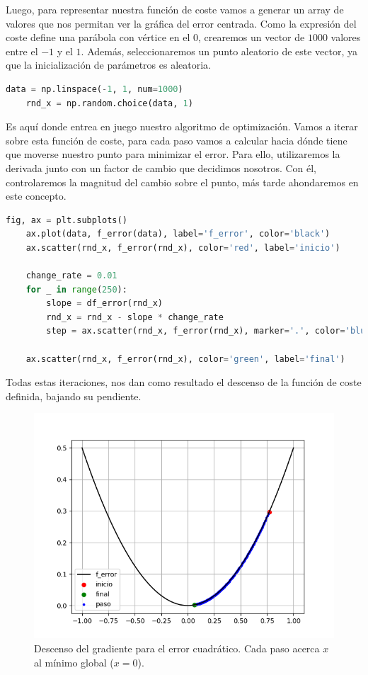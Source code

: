 Luego, para representar nuestra función de coste vamos a generar un array de valores que nos permitan ver la gráfica del error centrada. Como la expresión del coste define una parábola con vértice en el $0$, crearemos un vector de $1000$ valores entre el $-1$ y el $1$. Además, seleccionaremos un punto aleatorio de este vector, ya que la inicialización de parámetros es aleatoria.

\begin{lstlisting}[language=Python,label=code:descenso_grad_2d_2]
	data = np.linspace(-1, 1, num=1000)
	rnd_x = np.random.choice(data, 1)
\end{lstlisting}

Es aquí donde entrea en juego nuestro algoritmo de optimización. Vamos a iterar sobre esta función de coste, para cada paso vamos a calcular hacia dónde tiene que moverse nuestro punto para minimizar el error. Para ello, utilizaremos la derivada junto con un factor de cambio que decidimos nosotros. Con él, controlaremos la magnitud del cambio sobre el punto, más tarde ahondaremos en este concepto.

\begin{lstlisting}[language=Python,label=code:descenso_grad_2d_3]
	fig, ax = plt.subplots()
	ax.plot(data, f_error(data), label='f_error', color='black')
	ax.scatter(rnd_x, f_error(rnd_x), color='red', label='inicio')

	change_rate = 0.01
	for _ in range(250):
		slope = df_error(rnd_x)
		rnd_x = rnd_x - slope * change_rate
		step = ax.scatter(rnd_x, f_error(rnd_x), marker='.', color='blue')

	ax.scatter(rnd_x, f_error(rnd_x), color='green', label='final')
\end{lstlisting}

Todas estas iteraciones, nos dan como resultado el descenso de la función de coste definida, bajando su pendiente.

\begin{figure}[hb]
	\centering
	\includegraphics[width=0.6\linewidth]{figures/ejemplos/gradient_descent_2d.png}
	\caption{Descenso del gradiente para el error cuadrático. Cada paso acerca $x$ al mínimo global ($x=0$).}
	\label{fig:descenso_gradiente_2d}
\end{figure}

